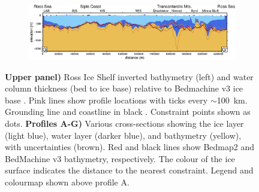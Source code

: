 \begin{figure}[p]
{\begin{subfigure}[t]{.6\textwidth}
    \end{subfigure}
    }
    \begin{subfigure}[t]{.95\textwidth}
        \includegraphics[width=\textwidth]{figures/chp4/profile_G.png}
    \end{subfigure}
    
  \caption[Ross Ice Shelf assorted cross-sections]{\textbf{Upper panel)} Ross Ice Shelf inverted bathymetry (left) and water column thickness (bed to ice base) relative to Bedmachine v3 ice base \citep{morlighemmeasures2022}. Pink lines show profile locations with ticks every $\sim$100~km. Grounding line and coastline in black \citep{mouginotmeasures2017}. Constraint points shown as dots. \textbf{Profiles A-G)} Various cross-sections showing the ice layer (light blue), water layer (darker blue), and bathymetry (yellow), with uncertainties (brown). Red and black lines show Bedmap2 and BedMachine v3 bathymetry, respectively. The colour of the ice surface indicates the distance to the nearest constraint. Legend and colourmap shown above profile A.}
    \label{fig:chp4_RIS_inversion_profiles}
\end{figure}

